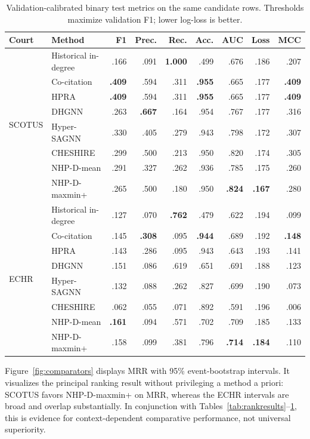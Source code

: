 \documentclass{svproc}
\begin{document}
\begin{table}[t]
\caption{Validation-calibrated binary test metrics on the same candidate rows. Thresholds maximize validation F1; lower log-loss is better.}
\label{tab:classification}
\centering
\scriptsize
\setlength{\tabcolsep}{1.45pt}
\renewcommand{\arraystretch}{.89}
\begin{tabular}{llrrrrrrr}
\toprule
Court & Method & F1 & Prec. & Rec. & Acc. & AUC & Loss & MCC\\
\midrule
\multirow{8}{*}{SCOTUS}
& Historical in-degree & .166 & .091 & \textbf{1.000} & .499 & .676 & .186 & .207\\
& Co-citation & \textbf{.409} & .594 & .311 & \textbf{.955} & .665 & .177 & \textbf{.409}\\
& HPRA & \textbf{.409} & .594 & .311 & \textbf{.955} & .665 & .177 & \textbf{.409}\\
& DHGNN & .263 & \textbf{.667} & .164 & .954 & .767 & .177 & .316\\
& Hyper-SAGNN & .330 & .405 & .279 & .943 & .798 & .172 & .307\\
& CHESHIRE & .299 & .500 & .213 & .950 & .820 & .174 & .305\\
& NHP-D-mean & .291 & .327 & .262 & .936 & .785 & .175 & .260\\
& NHP-D-maxmin+ & .265 & .500 & .180 & .950 & \textbf{.824} & \textbf{.167} & .280\\
\midrule
\multirow{8}{*}{ECHR}
& Historical in-degree & .127 & .070 & \textbf{.762} & .479 & .622 & .194 & .099\\
& Co-citation & .145 & \textbf{.308} & .095 & \textbf{.944} & .689 & .192 & \textbf{.148}\\
& HPRA & .143 & .286 & .095 & .943 & .643 & .193 & .141\\
& DHGNN & .151 & .086 & .619 & .651 & .691 & .188 & .123\\
& Hyper-SAGNN & .132 & .088 & .262 & .827 & .699 & .190 & .073\\
& CHESHIRE & .062 & .055 & .071 & .892 & .591 & .196 & .006\\
& NHP-D-mean & \textbf{.161} & .094 & .571 & .702 & .709 & .185 & .133\\
& NHP-D-maxmin+ & .158 & .099 & .381 & .796 & \textbf{.714} & \textbf{.184} & .110\\
\bottomrule
\end{tabular}
\end{table}

Figure~\ref{fig:comparators} displays MRR with 95\% event-bootstrap intervals. It visualizes the principal ranking result without privileging a method a priori: SCOTUS favors NHP-D-maxmin+ on MRR, whereas the ECHR intervals are broad and overlap substantially. In conjunction with Tables~\ref{tab:rankresults}--\ref{tab:classification}, this is evidence for context-dependent comparative performance, not universal superiority.
\end{document}
